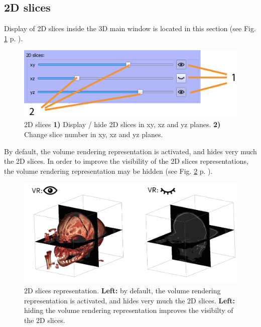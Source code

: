 \subsection{2D slices}
Display of 2D slices inside the 3D main window is located in this section (see Fig. \ref{volume_2Dslices} p. \pageref{volume_2Dslices}).
\begin{figure}
  \centering
  \includegraphics[scale=1]{images/14/volume_2Dslices2.png}
\caption{2D slices  \textbf{1)} Display / hide 2D slices in xy, xz and yz planes. \textbf{2)} Change slice number in xy, xz and yz planes.  }	
\label{volume_2Dslices}
 \end{figure}
By default, the volume rendering representation is activated, and hides very much the 2D slices. In order to improve the visibility of the 2D slices representations, the volume rendering representation may be hidden (see Fig. \ref{2D_slices_example} p. \pageref{2D_slices_example}).
\begin{figure}
  \centering
  \includegraphics[scale=0.3]{images/14/2Dslices_example/2Dslices_example.png}
\caption{2D slices representation. \textbf{Left:} by default, the volume rendering representation is activated, and hides very much the 2D slices. \textbf{Left:} hiding the volume rendering representation improves the visibilty of the 2D slices.}	 
\label{2D_slices_example}
 \end{figure}

